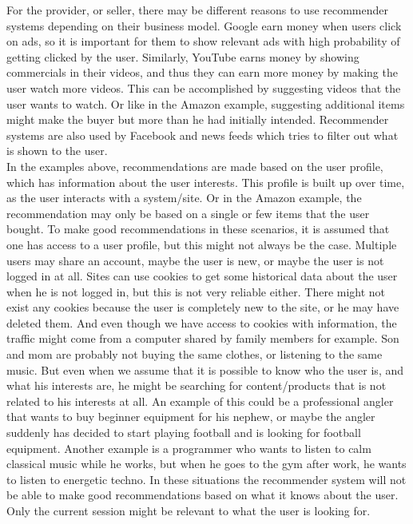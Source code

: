 For the provider, or seller, there may be different reasons to use recommender systems depending on their business model. Google earn money when users click on ads, so it is important for them to show relevant ads with high probability of getting clicked by the user. Similarly, YouTube earns money by showing commercials in their videos, and thus they can earn more money by making the user watch more videos. This can be accomplished by suggesting videos that the user wants to watch. Or like in the Amazon example, suggesting additional items might make the buyer but more than he had initially intended. Recommender systems are also used by Facebook and news feeds which tries to filter out what is shown to the user.\\


In the examples above, recommendations are made based on the user profile, which has information about the user interests. This profile is built up over time, as the user interacts with a system/site. Or in the Amazon example, the recommendation may only be based on a single or few items that the user bought. To make good recommendations in these scenarios, it is assumed that one has access to a user profile, but this might not always be the case. Multiple users may share an account, maybe the user is new, or maybe the user is not logged in at all. Sites can use cookies to get some historical data about the user when he is not logged in, but this is not very reliable either. There might not exist any cookies because the user is completely new to the site, or he may have deleted them. And even though we have access to cookies with information, the traffic might come from a computer shared by family members for example. Son and mom are probably not buying the same clothes, or listening to the same music. But even when we assume that it is possible to know who the user is, and what his interests are, he might be searching for content/products that is not related to his interests at all. An example of this could be a professional angler that wants to buy beginner equipment for his nephew, or maybe the angler suddenly has decided to start playing football and is looking for football equipment. Another example is a programmer who wants to listen to calm classical music while he works, but when he goes to the gym after work, he wants to listen to energetic techno. In these situations the recommender system will not be able to make good recommendations based on what it knows about the user. Only the current session might be relevant to what the user is looking for.\\

